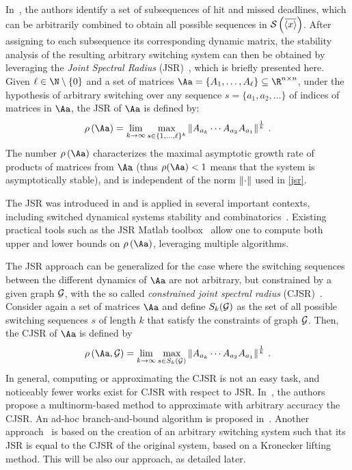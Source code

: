 In~\cite{Maggio:2020}, the authors identify a set of subsequences of hit and missed deadlines, which can be arbitrarily combined to obtain all possible sequences in $\sset{}{\overbar{\left<x\right>}}$.
After assigning to each subsequence its corresponding dynamic matrix, the stability analysis of the resulting arbitrary switching system can then be obtained by leveraging the \emph{Joint Spectral Radius} (JSR)~\cite{Jungers2009}, which is briefly presented here.
%
Given $\ell\in\N\setminus \left\{ 0 \right\} $ and a set of matrices $\Aa = \{A_1, \ldots, A_\ell \} \subseteq \R^{n\times n}$, under the hypothesis of arbitrary switching over any sequence $s=\{a_1,a_2,\dots\}$ of indices of matrices in $\Aa$, the JSR of $\Aa$ is defined by:
\begin{equation}
    \label{jsr}
    \rho\left(\Aa\right)= \lim_{k\rightarrow\infty} \max_{s\in\{1,\ldots,\ell\}^k} \norm{A_{a_k} \cdots A_{a_2}A_{a_1}}^{\frac{1}{k}} \,.
\end{equation}
The number $\rho\left(\Aa\right)$ characterizes the maximal asymptotic growth rate of products of matrices from $\Aa$ (thus  $\rho(\Aa)<1$ means that the system is asymptotically stable), and is independent of the norm $\left\lVert\cdot\right\rVert$ used in \eqref{jsr}.

The JSR was introduced in \cite{rota} and is applied in several important contexts, including switched dynamical systems stability and combinatorics~\cite{Jungers2009}.
Existing practical tools such as the JSR Matlab toolbox~\cite{vankeerberghen2014jsr} allow one to compute both upper and lower bounds on $\rho\left(\Aa\right)$, leveraging multiple algorithms.

The JSR approach can be generalized for the case where the switching sequences between the different dynamics of $\Aa$ are not arbitrary, but constrained by a given graph $\mathcal{G}_{}$, with the so called \emph{constrained joint spectral radius} (CJSR)~\cite{dai2012gelfand}.
Consider again a set of matrices $\Aa$ and define ${S}_k(\mathcal{G}_{})$ as the set of all possible switching sequences $s$ of length $k$ that satisfy the constraints of graph $\mathcal{G}_{}$.
Then, the CJSR of $\Aa$ is defined by
\begin{equation}
\label{cjsr}
    \rho\left(\Aa,\GG{}\right)= \lim_{k\rightarrow\infty} \max_{s\in{S}_k(\GG{})} \norm{A_{a_k} \cdots A_{a_2}A_{a_1}}^{\frac{1}{k}} \,.
\end{equation}
In general, computing or approximating the CJSR is not an easy task, and noticeably fewer works exist for CJSR with respect to JSR.
In~\cite{philippe2016stability}, the authors propose a multinorm-based method to approximate with arbitrary accuracy the CJSR.
An ad-hoc branch-and-bound algorithm is proposed in~\cite{dercole2017simple}.
Another approach~\cite{kozyakin2014berger, wang2014stability, xu2020approximation} is based on the creation of an arbitrary switching system such that its JSR is equal to the CJSR of the original system, based on a Kronecker lifting method.
This will be also our approach, as detailed later.

